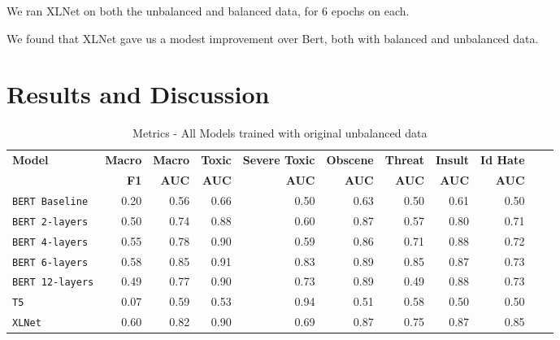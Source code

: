 \documentclass[11pt,a4paper]{article}
\begin{document}
We ran XLNet on both the unbalanced and balanced data, for 6 epochs on each.

We found that XLNet gave us a modest improvement over Bert, both with balanced and unbalanced data.

\FloatBarrier
\section{Results and Discussion}

\begin{table}

\centering
\begin{tabular}{lrrrrrrrrrr}
\hline
\textbf{Model} & \textbf{Macro} & \textbf{Macro} & \textbf{Toxic} & \textbf{Severe Toxic} & \textbf{Obscene} & \textbf{Threat} & \textbf{Insult} & \textbf{Id Hate}
\\
\textbf{ } & \textbf{F1} & \textbf{AUC} & \textbf{AUC} & \textbf{AUC} & \textbf{AUC} & \textbf{AUC} & \textbf{AUC} & \textbf{AUC}\\
\hline
\verb|BERT Baseline|&0.20 & 0.56 & 0.66 & 0.50 & 0.63 & 0.50 & 0.61 & 0.50 \\
\verb|BERT 2-layers| & 0.50 & 0.74 & 0.88 & 0.60 & 0.87 & 0.57 & 0.80 & 0.71 \\
\verb|BERT 4-layers| & 0.55 & 0.78 & 0.90 & 0.59 & 0.86 & 0.71 & 0.88 & 0.72 \\
\verb|BERT 6-layers| & 0.58 & 0.85 & 0.91 & 0.83 & 0.89 & 0.85 & 0.87 & 0.73 \\
\verb|BERT 12-layers| & 0.49 & 0.77 & 0.90 & 0.73 & 0.89 & 0.49 & 0.88 & 0.73 \\
\verb|T5| & 0.07 & 0.59 & 0.53 & 0.94 & 0.51 & 0.58 & 0.50 & 0.50 \\
\verb|XLNet| & 0.60 & 0.82 & 0.90 & 0.69 & 0.87 & 0.75 & 0.87 & 0.85 \\
\hline
\end{tabular}
\caption{Metrics - All Models trained with original unbalanced data}
\label{table:UnBalResults}
\end{table}
\end{document}
